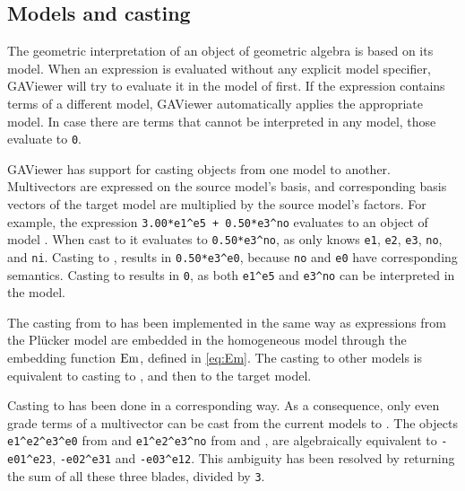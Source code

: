 \subsection{Models and casting}
The geometric interpretation of an object of geometric algebra is based on its model.  When an expression is evaluated without any explicit model specifier, GAViewer will try to evaluate it in the model of \ega{} first.  If the expression contains terms of a different model, GAViewer automatically applies the appropriate model.  In case there are terms that cannot be interpreted in any model, those evaluate to \texttt{0}.

GAViewer has support for casting objects from one model to another.  Multivectors are expressed on the source model's basis, and corresponding basis vectors of the target model are multiplied by the source model's factors.  For example, the expression \texttt{3.00*e1\^{}e5 + 0.50*e3\^{}no} evaluates to an object of model \cbga{}.  When cast to \cga{} it evaluates to \texttt{0.50*e3\^{}no}, as \cga{} only knows \texttt{e1}, \texttt{e2}, \texttt{e3}, \texttt{no}, and \texttt{ni}.  Casting to \pga{}, results in \texttt{0.50*e3\^{}e0}, because \texttt{no} and \texttt{e0} have corresponding semantics.  Casting to \ega{} results in \texttt{0}, as both \texttt{e1\^{}e5} and \texttt{e3\^{}no} can be interpreted in the model.

The casting from \lga{} to \pga{} has been implemented in the same way as expressions from the Pl\"ucker model are embedded in the homogeneous model through the embedding function $\operatorname{Em}$, defined in \autoref{eq:Em}.  The casting to other models is equivalent to casting to \pga{}, and then to the target model.

Casting to \lga{} has been done in a corresponding way.  As a consequence, only even grade terms of a multivector can be cast from the current models to \lga{}.  The objects \texttt{e1\^{}e2\^{}e3\^{}e0} from \pga{} and \texttt{e1\^{}e2\^{}e3\^{}no} from \cga{} and \cbga{}, are algebraically equivalent to \texttt{-e01\^{}e23}, \texttt{-e02\^{}e31} and \texttt{-e03\^{}e12}.  This ambiguity has been resolved by returning the sum of all these three blades, divided by \texttt{3}.

